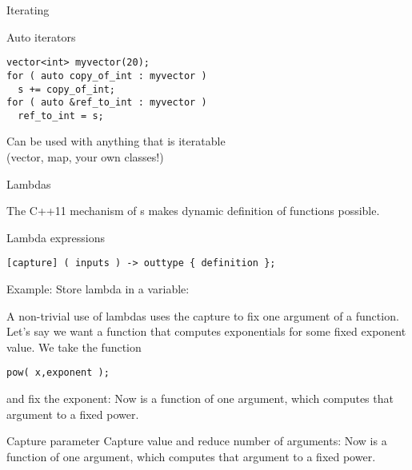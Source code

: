 \begin{comment}
  \begin{block}{Auto plus}
    \label{sl:auto-plus-const}
    Keywords like \n{const} and the reference character~\n{\&} can be
    added:
\begin{verbatim}
// class member
  some_object my_object;
// class method:
  some_object &get_some_object() { return my_object; };
// main program:
auto object_copy  = thing.get_some_object();
auto &object_mutable  = thing.get_some_object();
const auto &object_immutable  = thing.get_some_object();
\end{verbatim}
  \end{block}
\end{comment}

 {Iterating}

\begin{block}{Auto iterators}
  \label{sl:auto-iterator}
\begin{verbatim}
vector<int> myvector(20);
for ( auto copy_of_int : myvector )
  s += copy_of_int;
for ( auto &ref_to_int : myvector )
  ref_to_int = s;
\end{verbatim}
Can be used with anything that is iteratable\\
(vector, map, your own classes!)
\end{block}

 {Lambdas}

The C++11 mechanism of s makes
dynamic definition of functions possible.

\begin{block}{Lambda expressions}
  \label{sl:lambda-syntax}
\begin{verbatim}
[capture] ( inputs ) -> outtype { definition };
\end{verbatim}
Example:
Store lambda in a variable:
\end{block}

A non-trivial use of lambdas uses the capture to fix one argument of a
function.
Let's say we want a function that computes exponentials for some fixed
exponent value. We take the 
 function
\begin{verbatim}
pow( x,exponent );
\end{verbatim}
and fix the exponent:
%
%
Now  is a function of one argument, which computes
that argument to a fixed power.

\begin{slide}{Capture parameter}
  \label{sl:lambda-capture}
  Capture value and reduce number of arguments:
  Now  is a function of one argument, which computes
  that argument to a fixed power.
\end{slide}

